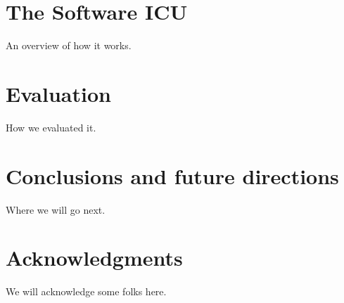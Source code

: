 \documentclass{acm_proc_article-sp}
\begin{document}
\section{The Software ICU}

An overview of how it works.  

\section{Evaluation}

How we evaluated it.

\section{Conclusions and future directions}

Where we will go next.

\section{Acknowledgments}

We will acknowledge some folks here.


  
\end{document}
